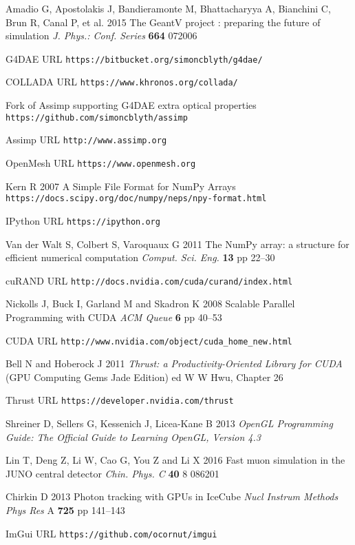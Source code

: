 \documentclass[a4paper]{jpconf}
\begin{document}
\begin{thebibliography}{9}
Amadio G, Apostolakis J, Bandieramonte M, Bhattacharyya A, Bianchini C, Brun R, Canal P, et al.
2015
The GeantV project : preparing the future of simulation 
{\it J. Phys.: Conf. Series} {\bf 664} 072006



G4DAE URL {\tt https://bitbucket.org/simoncblyth/g4dae/}

COLLADA URL {\tt https://www.khronos.org/collada/}

Fork of Assimp supporting G4DAE extra optical properties {\tt https://github.com/simoncblyth/assimp}

Assimp URL {\tt http://www.assimp.org}

OpenMesh URL {\tt https://www.openmesh.org}


Kern R
2007
A Simple File Format for NumPy Arrays
{\tt https://docs.scipy.org/doc/numpy/neps/npy-format.html}

IPython URL {\tt https://ipython.org}

Van der Walt S, Colbert S, Varoquaux G 
2011 
The NumPy array: a structure for efficient numerical computation
{\it Comput. Sci. Eng.} {\bf 13} pp 22--30



cuRAND URL {\tt http://docs.nvidia.com/cuda/curand/index.html}

Nickolls J, Buck I, Garland M and Skadron K 
2008
Scalable Parallel Programming with CUDA
{\it ACM Queue} {\bf 6} pp 40--53

CUDA URL {\tt http://www.nvidia.com/object/cuda\_home\_new.html}


Bell N and Hoberock J 
2011
{\it Thrust: a Productivity-Oriented Library for CUDA}
(GPU Computing Gems Jade Edition) ed W W Hwu, Chapter 26   

Thrust URL {\tt https://developer.nvidia.com/thrust}




Shreiner D, Sellers G, Kessenich J, Licea-Kane B 
2013
{\it OpenGL Programming Guide: The Official Guide to Learning OpenGL, Version 4.3}













Lin T, Deng Z, Li W, Cao G, You Z and Li X
2016
Fast muon simulation in the JUNO central detector
{\it Chin. Phys. C} {\bf 40} 8 086201

Chirkin D
2013
Photon tracking with GPUs in IceCube
{\it Nucl Instrum Methods Phys Res} A {\bf 725} pp 141--143
%

ImGui URL {\tt https://github.com/ocornut/imgui}

\end{thebibliography}
\end{document}
